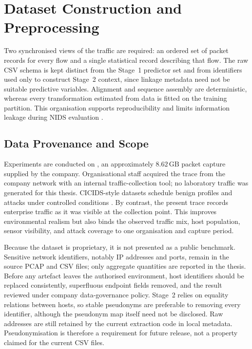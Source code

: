 \documentclass[11pt,fleqn]{report}
\begin{document}
\providecommand{\datasetfield}[1]{\texttt{\detokenize{#1}}}


\chapter{Dataset Construction and Preprocessing}
\label{sec:dataset_preprocessing}

Two synchronised views of the traffic are required: an ordered set of packet records for every flow and a single statistical record describing that flow. The raw CSV schema is kept distinct from the Stage~1 predictor set and from identifiers used only to construct Stage~2 context, since linkage metadata need not be suitable predictive variables. Alignment and sequence assembly are deterministic, whereas every transformation estimated from data is fitted on the training partition. This organisation supports reproducibility and limits information leakage during NIDS evaluation \cite{Shiravi2012DatasetGeneration,Ring2019Datasets,Goldschmidt2025Datasets,Pinto2025DatasetReview}.

\section{Data Provenance and Scope}
\label{subsec:data_provenance}

Experiments are conducted on \datasetfield{ar002_et12_20260511_001.pcap}, an approximately $8.62\,\mathrm{GB}$ packet capture supplied by the company. Organisational staff acquired the trace from the company network with an internal traffic-collection tool; no laboratory traffic was generated for this thesis. CICIDS-style datasets schedule benign profiles and attacks under controlled conditions \cite{Sharafaldin2018CICIDS}. By contrast, the present trace records enterprise traffic as it was visible at the collection point. This improves environmental realism but also binds the observed traffic mix, host population, sensor visibility, and attack coverage to one organisation and capture period.

Because the dataset is proprietary, it is not presented as a public benchmark. Sensitive network identifiers, notably IP addresses and ports, remain in the source PCAP and CSV files; only aggregate quantities are reported in the thesis. Before any artefact leaves the authorised environment, host identifiers should be replaced consistently, superfluous endpoint fields removed, and the result reviewed under company data-governance policy. Stage~2 relies on equality relations between hosts, so stable pseudonyms are preferable to removing every identifier, although the pseudonym map itself need not be disclosed. Raw addresses are still retained by the current extraction code in local metadata. Pseudonymisation is therefore a requirement for future release, not a property claimed for the current CSV files.
\end{document}

